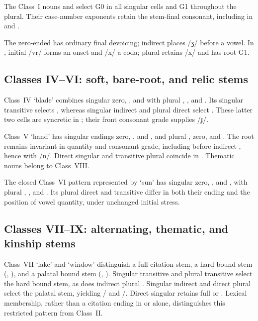 
\FloatBarrier

The Class~I nouns   and  
select G0 in all singular cells and G1 throughout the plural.
Their case-number exponents retain the stem-final consonant, including
 in  and .



The zero-ended  has ordinary final devoicing;
indirect  places /ʒ/ before a vowel.
In , initial /vr/ forms an onset and /x/ a coda;
plural  retains /x/ and has root G1.

\subsection{Classes IV--VI: soft, bare-root, and relic stems}
\label{sec:nm-classes-iv-vi}

Class~IV  `blade' combines singular zero, , and  with
plural , , and . Its singular transitive selects
, whereas singular indirect and plural direct select .
These latter two cells are syncretic in ; their front
consonant grade supplies /ɟ/.

Class~V  `hand' has singular endings zero, , and , and
plural , zero, and . The root  remains invariant
in quantity and consonant grade, including before indirect , hence
 with /n/. Direct singular and transitive plural coincide
in . Thematic  nouns belong to Class~VIII.

The closed Class~VI pattern represented by  `sun' has singular zero,
, and , with plural , , and
. Its plural direct  and transitive
 differ in both their ending and the position of vowel
quantity, under unchanged initial stress.


\FloatBarrier

\subsection{Classes VII--IX: alternating, thematic, and kinship stems}
\label{sec:nm-classes-vii-ix}

Class~VII  `lake' and  `window' distinguish a full citation
stem, a hard bound stem (, ), and a palatal bound
stem (, ). Singular transitive  and plural
transitive  select the hard bound stem, as does indirect plural
. Singular indirect  and direct plural  select
the palatal stem, yielding / and
/. Direct singular retains full
 or . Lexical membership,
rather than a citation ending in  or  alone, distinguishes
this restricted pattern from Class~II.

